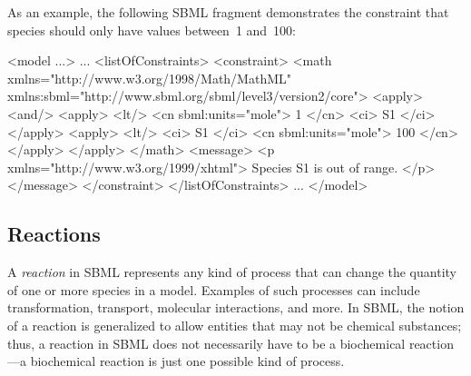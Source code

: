 As an example, the following SBML fragment demonstrates the
constraint that species  should only have values between~1
and~100:

\begin{example}
<model ...>
    ...
    <listOfConstraints>
        <constraint>
            <math xmlns="http://www.w3.org/1998/Math/MathML"
                  xmlns:sbml="http://www.sbml.org/sbml/level3/version2/core">
                <apply>
                    <and/>
                        <apply> 
                            <lt/>
                            <cn sbml:units="mole"> 1 </cn> 
                            <ci> S1 </ci>
                        </apply>
                        <apply>
                            <lt/>
                            <ci> S1 </ci> 
                            <cn sbml:units="mole"> 100 </cn> 
                        </apply>
                </apply>
            </math>
            <message>
                <p xmlns="http://www.w3.org/1999/xhtml"> Species S1 is out of range. </p>
            </message>
        </constraint>
    </listOfConstraints>
    ...
</model>
\end{example}


\subsection{Reactions}
\label{sec:reactions}

A \emph{reaction} in SBML represents any kind of process that can
change the quantity of one or more species in a model.  Examples
of such processes can include transformation, transport, molecular
interactions, and more.  In SBML, the notion of a reaction is
generalized to allow entities that may not be chemical substances;
thus, a reaction in SBML does not necessarily have to be a
biochemical reaction---a biochemical reaction is just one possible
kind of process.

